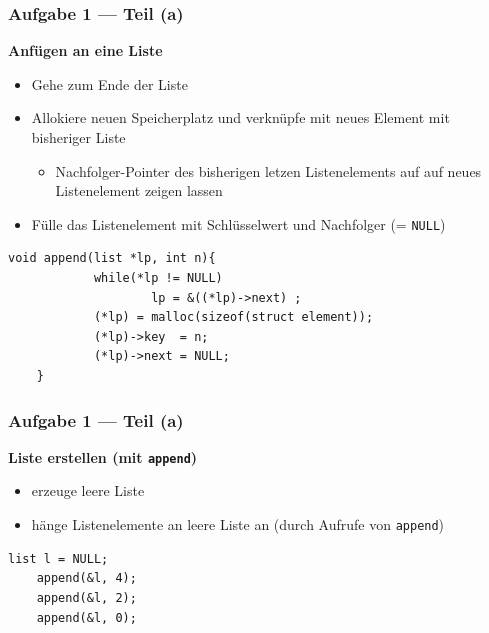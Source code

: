 \documentclass{beamer}
\begin{document}
\begin{frame}[fragile] \frametitle{Aufgabe 1 --- Teil (a)}
	\textbf{Anfügen an eine Liste}
	\begin{itemize}
		\item Gehe zum Ende der Liste
		\item Allokiere neuen Speicherplatz und verknüpfe mit neues Element mit bisheriger Liste
		\begin{itemize}
			\item Nachfolger-Pointer des bisherigen letzen Listenelements auf auf neues Listenelement zeigen lassen
		\end{itemize}
		\item Fülle das Listenelement mit Schlüsselwert und Nachfolger (= \texttt{NULL})
	\end{itemize}

	\pause
	
	\begin{lstlisting}[style=notebook]
	void append(list *lp, int n){
			while(*lp != NULL) 
					lp = &((*lp)->next) ; 
			(*lp) = malloc(sizeof(struct element)); 
			(*lp)->key  = n;   
			(*lp)->next = NULL; 
	}
	\end{lstlisting}
\end{frame}

\begin{frame}[fragile] \frametitle{Aufgabe 1 --- Teil (a)}
	\textbf{Liste erstellen (mit \texttt{append})}
	\begin{itemize}
		\item erzeuge leere Liste
		\item hänge Listenelemente an leere Liste an (durch Aufrufe von \texttt{append})
	\end{itemize}
	
	\pause
	
	\begin{lstlisting}[style=notebook]
	list l = NULL;
	append(&l, 4);
	append(&l, 2);
	append(&l, 0);
	\end{lstlisting}
\end{frame}
\end{document}
